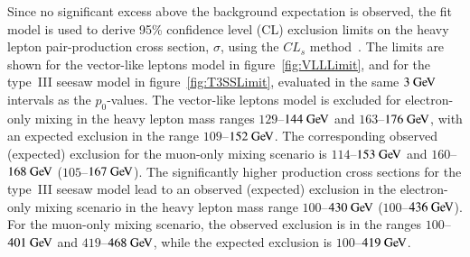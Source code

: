 Since no significant excess above the background expectation is observed, the fit model is used to derive 95\% confidence level (CL) exclusion limits on the heavy lepton pair-production cross section, $\sigma$, using the $CL_s$ method~\cite{CLs}. The limits are shown for the vector-like leptons model in figure~\ref{fig:VLLLimit}, and for the type~III seesaw model in figure~\ref{fig:T3SSLimit}, evaluated in the same $3 \GeV$ intervals as the $p_0$-values.
The vector-like leptons model is excluded for electron-only mixing in the heavy lepton mass ranges $129$--$144 \GeV$ and $163$--$176 \GeV$, with an expected exclusion in the range $109$--$152 \GeV$. The corresponding observed (expected) exclusion for the muon-only mixing scenario is $114$--$153 \GeV$ and $160$--$168 \GeV$ ($105$--$167 \GeV $).
The significantly higher production cross sections for the type~III seesaw model lead to an observed (expected) exclusion in the electron-only mixing scenario in the heavy lepton mass range $100$--$430 \GeV$  ($100$--$436 \GeV$). For the muon-only mixing scenario, the observed exclusion is in the ranges $100$--$401 \GeV$ and $419$--$468 \GeV$, while the expected exclusion is $100$--$419 \GeV$.


